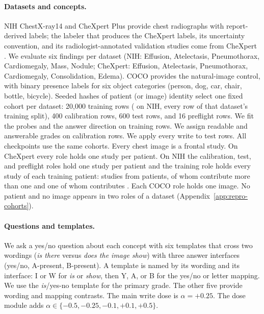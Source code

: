 \documentclass{article}
\begin{document}
\paragraph{Datasets and concepts.}
NIH ChestX-ray14 \citep{wang2017chestxray} and CheXpert Plus \citep{chambon2024chexpertplus} provide chest radiographs with report-derived labels; the labeler that produces the CheXpert labels, its uncertainty convention, and its radiologist-annotated validation studies come from CheXpert \citep{irvin2019chexpert}. We evaluate six findings per dataset (NIH: Effusion, Atelectasis, Pneumothorax, Cardiomegaly, Mass, Nodule; CheXpert: Effusion, Atelectasis, Pneumothorax, Cardiomegaly, Consolidation, Edema). COCO \citep{lin2014coco} provides the natural-image control, with binary presence labels for six object categories (person, dog, car, chair, bottle, bicycle). Seeded hashes of patient (or image) identity select one fixed cohort per dataset: 20{,}000 training rows (\cfCohortNihTrainRows{} on NIH, every row of that dataset's training split), 400 calibration rows, 600 test rows, and 16 preflight rows. We fit the probes and the answer direction on training rows. We assign readable and answerable grades on calibration rows. We apply every write to test rows. All checkpoints use the same cohorts. Every chest image is a frontal study. On CheXpert every role holds one study per patient. On NIH the calibration, test, and preflight roles hold one study per patient and the training role holds every study of each training patient: \cfCohortNihTrainRows{} studies from \cfCohortNihTrainUnits{} patients, \cfCohortNihTrainMulti{} of whom contribute more than one and one of whom contributes \cfCohortNihTrainMax{}. Each COCO role holds one image. No patient and no image appears in two roles of a dataset (Appendix~\ref{app:repro-cohorts}).

\paragraph{Questions and templates.}
We ask a yes/no question about each concept with six templates that cross two wordings (\emph{is there} versus \emph{does the image show}) with three answer interfaces (yes/no, A-present, B-present). A template is named by its wording and its interface: I or W for \emph{is} or \emph{show}, then Y, A, or B for the yes/no or letter mapping. We use the \emph{is}/yes-no template for the primary grade. The other five provide wording and mapping contrasts. The main write dose is $\alpha=+0.25$. The dose module adds $\alpha\in\{-0.5,-0.25,-0.1,+0.1,+0.5\}$.
\end{document}
